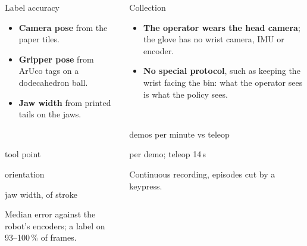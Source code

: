 \documentclass[final]{beamer}
\newcommand{\key}[1]{\textbf{\color{navy}#1}}
\newcommand{\bignum}[2]{\begin{minipage}[t]{#1}\centering{\fontsize{66}{70}\selectfont\bfseries\color{amber}#2}\end{minipage}}
\newcommand{\numlabel}[2]{\begin{minipage}[t]{#1}\centering\small\color{muted}#2\end{minipage}}
\newcommand{\capt}[1]{{\small\color{muted}#1\par}}
\begin{document}
\begin{frame}[t]
\begin{columns}[t,totalwidth=0.975\paperwidth]
\begin{column}{0.655\linewidth}
\begin{columns}[t,totalwidth=\linewidth]
\begin{column}{0.325\linewidth}
\begin{block}{Label accuracy}
  \begin{itemize}
    \item \key{Camera pose} from the paper tiles.
    \item \key{Gripper pose} from ArUco tags on a dodecahedron ball.
    \item \key{Jaw width} from printed tails on the jaws.
  \end{itemize}
  \vspace{0.3ex}
  \begin{center}
  \bignum{0.31\linewidth}{6.5\,mm}\bignum{0.31\linewidth}{1.6\textdegree}\bignum{0.34\linewidth}{3.5\,\%}\\[0.3ex]
  \numlabel{0.31\linewidth}{tool point}\numlabel{0.31\linewidth}{orientation}\numlabel{0.34\linewidth}{jaw width, of stroke}
  \end{center}
  \capt{Median error against the robot's encoders; a label on 93--100\,\% of frames.}
  \vspace{1.1ex}
\end{block}
\end{column}

\begin{column}{0.325\linewidth}
\begin{block}{Collection}
  \begin{itemize}
    \item \key{The operator wears the head camera}; the glove has no wrist camera, IMU or encoder.
    \item \key{No special protocol}, such as keeping the wrist facing the bin: what the operator sees is what the policy sees.
  \end{itemize}
  \vspace{0.3ex}
  \begin{center}
  \bignum{0.48\linewidth}{2--3$\times$}\bignum{0.48\linewidth}{6--8\,s}\\[0.3ex]
  \numlabel{0.48\linewidth}{demos per minute vs teleop}\numlabel{0.48\linewidth}{per demo; teleop 14\,s}
  \end{center}
  \capt{Continuous recording, episodes cut by a keypress.}
\end{block}
\end{column}


\end{columns}
\end{column}
\end{columns}
\end{frame}
\end{document}
